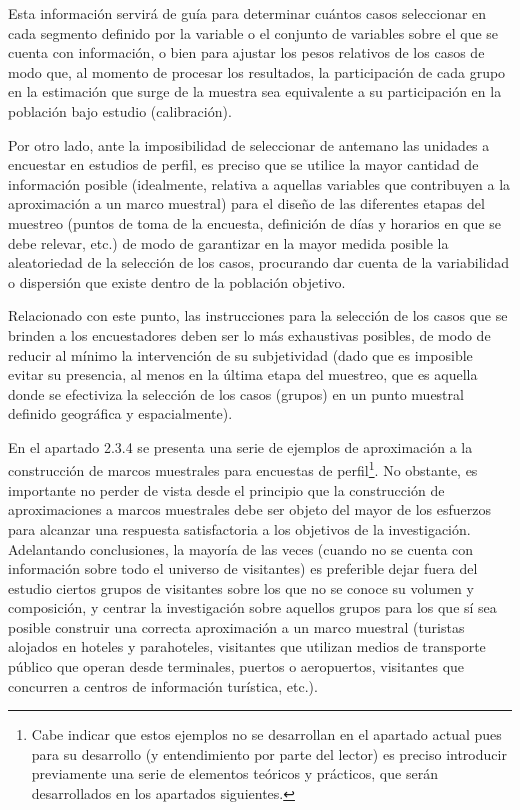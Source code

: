 \documentclass[
]{book}
\begin{document}
Esta información servirá de guía para determinar cuántos casos seleccionar en cada segmento definido por la variable o el conjunto de variables sobre el que se cuenta con información, o bien para ajustar los pesos relativos de los casos de modo que, al momento de procesar los resultados, la participación de cada grupo en la estimación que surge de la muestra sea equivalente a su participación en la población bajo estudio (calibración).

Por otro lado, ante la imposibilidad de seleccionar de antemano las unidades a encuestar en estudios de perfil, es preciso que se utilice la mayor cantidad de información posible (idealmente, relativa a aquellas variables que contribuyen a la aproximación a un marco muestral) para el diseño de las diferentes etapas del muestreo (puntos de toma de la encuesta, definición de días y horarios en que se debe relevar, etc.) de modo de garantizar en la mayor medida posible la aleatoriedad de la selección de los casos, procurando dar cuenta de la variabilidad o dispersión que existe dentro de la población objetivo.

Relacionado con este punto, las instrucciones para la selección de los casos que se brinden a los encuestadores deben ser lo más exhaustivas posibles, de modo de reducir al mínimo la intervención de su subjetividad (dado que es imposible evitar su presencia, al menos en la última etapa del muestreo, que es aquella donde se efectiviza la selección de los casos (grupos) en un punto muestral definido geográfica y espacialmente).

En el apartado 2.3.4 se presenta una serie de ejemplos de aproximación a la construcción de marcos muestrales para encuestas de perfil\footnote{Cabe indicar que estos ejemplos no se desarrollan en el apartado actual pues para su desarrollo (y entendimiento por parte del lector) es preciso introducir previamente una serie de elementos teóricos y prácticos, que serán desarrollados en los apartados siguientes.}. No obstante, es importante no perder de vista desde el principio que la construcción de aproximaciones a marcos muestrales debe ser objeto del mayor de los esfuerzos para alcanzar una respuesta satisfactoria a los objetivos de la investigación. Adelantando conclusiones, la mayoría de las veces (cuando no se cuenta con información sobre todo el universo de visitantes) es preferible dejar fuera del estudio ciertos grupos de visitantes sobre los que no se conoce su volumen y composición, y centrar la investigación sobre aquellos grupos para los que sí sea posible construir una correcta aproximación a un marco muestral (turistas alojados en hoteles y parahoteles, visitantes que utilizan medios de transporte público que operan desde terminales, puertos o aeropuertos, visitantes que concurren a centros de información turística, etc.).
\end{document}
